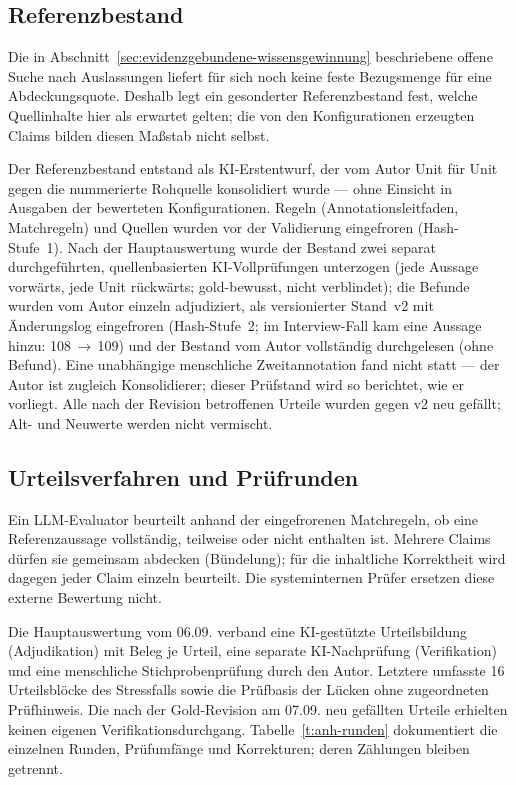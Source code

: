 \subsection{Referenzbestand}
\label{sec:eval-gold}

Die in Abschnitt~\ref{sec:evidenzgebundene-wissensgewinnung}
beschriebene offene Suche nach Auslassungen liefert für sich noch
keine feste Bezugsmenge für eine Abdeckungsquote. Deshalb legt ein
gesonderter Referenzbestand fest, welche Quellinhalte hier als
erwartet gelten; die von den Konfigurationen erzeugten Claims bilden
diesen Maßstab nicht selbst.

Der Referenzbestand entstand als KI-Erstentwurf, der vom Autor
Unit für Unit gegen die nummerierte Rohquelle konsolidiert wurde
--- ohne Einsicht in Ausgaben der bewerteten Konfigurationen.
Regeln (Annotationsleitfaden, Matchregeln) und Quellen wurden vor
der Validierung eingefroren (Hash-Stufe~1). Nach der
Hauptauswertung wurde der Bestand zwei separat durchgeführten,
quellenbasierten KI-Vollprüfungen unterzogen (jede Aussage vorwärts, jede
Unit rückwärts; gold-bewusst, nicht verblindet); die Befunde
wurden vom Autor einzeln adjudiziert, als versionierter Stand~v2
mit Änderungslog eingefroren (Hash-Stufe~2; im Interview-Fall kam
eine Aussage hinzu: 108\,$\rightarrow$\,109) und der Bestand vom
Autor vollständig durchgelesen (ohne Befund). Eine unabhängige
menschliche Zweitannotation fand nicht statt --- der Autor ist
zugleich Konsolidierer; dieser Prüfstand wird so berichtet, wie er
vorliegt. Alle nach der Revision betroffenen Urteile wurden gegen
v2 neu gefällt; Alt- und Neuwerte werden nicht vermischt.

\subsection{Urteilsverfahren und Prüfrunden}
\label{sec:eval-urteile}

Ein LLM-Evaluator beurteilt anhand der eingefrorenen Matchregeln,
ob eine Referenzaussage vollständig, teilweise oder nicht
enthalten ist. Mehrere Claims dürfen sie gemeinsam abdecken
(Bündelung); für die inhaltliche Korrektheit wird dagegen jeder
Claim einzeln beurteilt. Die systeminternen Prüfer ersetzen diese
externe Bewertung nicht.

Die Hauptauswertung vom 06.09. verband eine KI-gestützte
Urteilsbildung (Adjudikation) mit Beleg je Urteil, eine separate
KI-Nachprüfung (Verifikation) und eine menschliche
Stichprobenprüfung durch den Autor. Letztere umfasste
16 Urteilsblöcke des Stressfalls sowie die Prüfbasis der Lücken
ohne zugeordneten Prüfhinweis. Die nach der Gold-Revision am
07.09. neu gefällten Urteile erhielten keinen eigenen Verifikationsdurchgang.
Tabelle~\ref{t:anh-runden} dokumentiert die einzelnen Runden,
Prüfumfänge und Korrekturen; deren Zählungen bleiben getrennt.

